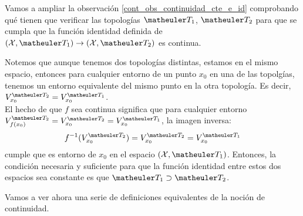 \begin{exa}
	Vamos a ampliar la observación \ref{cont_obs_continuidad_cte_e_id} comprobando qué tienen que verificar las topologías $\T_1$, $\T_2$ para que se cumpla que la función identidad definida de $(\X,\T_1)\to(\X,\T_2)$ es continua.
	
	Notemos que aunque tenemos dos topologías distintas, estamos en el mismo espacio, entonces para cualquier entorno de un punto $x_0$ en una de las topolgías, tenemos un entorno equivalente del mismo punto en la otra topología. Es decir, $V^{\T_2}_{x_0} = V^{\T_1}_{x_0}$. \\
	El hecho de que $f$ sea continua significa que para cualquier entorno $V^{\T_2}_{f(x_0)} = V^{\T_2}_{x_0} = V^{\T_1}_{x_0}$, la imagen inversa:
	\[f^{-1}(V^{\T_2}_{x_0})=V^{\T_2}_{x_0}=V^{\T_1}_{x_0}\]
	cumple que es entorno de $x_0$ en el espacio $(\X,\T_1)$. Entonces, la condición necesaria y suficiente para que la función identidad entre estos dos espacios sea constante es que $\T_1\supset \T_2$.
\end{exa}

Vamos a ver ahora una serie de definiciones equivalentes de la noción de continuidad.

